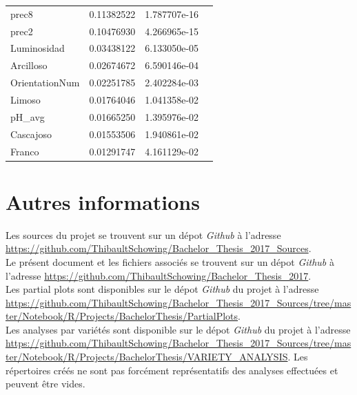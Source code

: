 \begin{table}[H]
\begin{tabular}{llll}
		prec8          & 0.11382522 & 1.787707e-16  \\
		prec2          & 0.10476930 & 4.266965e-15  \\
		Luminosidad    & 0.03438122 & 6.133050e-05  \\
		Arcilloso      & 0.02674672 & 6.590146e-04  \\
		OrientationNum & 0.02251785 & 2.402284e-03  \\
		Limoso         & 0.01764046 & 1.041358e-02  \\
		pH\_avg        & 0.01665250 & 1.395976e-02  \\
		Cascajoso      & 0.01553506 & 1.940861e-02  \\
		Franco         & 0.01291747 & 4.161129e-02 
	\end{tabular}
\end{table}















\chapter{Autres informations \label{annexeAutre}}

\noindent Les sources du projet se trouvent sur un dépot \textit{Github} à l'adresse \url{https://github.com/ThibaultSchowing/Bachelor_Thesis_2017_Sources}.\\


\noindent Le présent document et les fichiers associés se trouvent sur un dépot \textit{Github} à l'adresse \url{https://github.com/ThibaultSchowing/Bachelor_Thesis_2017}.\\



\noindent Les partial plots sont disponibles sur le dépot \textit{Github} du projet à l'adresse \url{https://github.com/ThibaultSchowing/Bachelor_Thesis_2017_Sources/tree/master/Notebook/R/Projects/BachelorThesis/PartialPlots}. \\


\noindent Les analyses par variétés sont disponible sur le dépot \textit{Github} du projet à l'adresse \url{https://github.com/ThibaultSchowing/Bachelor_Thesis_2017_Sources/tree/master/Notebook/R/Projects/BachelorThesis/VARIETY_ANALYSIS}. Les répertoires créés ne sont pas forcément représentatifs des analyses effectuées et peuvent être vides. \\





















